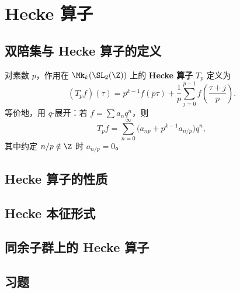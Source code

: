 \chapter{Hecke 算子}
\label{ch:hecke-operators}

\section{双陪集与 Hecke 算子的定义}

\begin{definition}[Hecke 算子]
对素数 $p$，作用在 $\Mk_k(\SL_2(\Z))$ 上的 \textbf{Hecke 算子} $T_p$ 定义为
\[
  (T_p f)(\tau) = p^{k-1} f(p\tau)
  + \frac{1}{p} \sum_{j=0}^{p-1} f\!\left(\frac{\tau + j}{p}\right).
\]
等价地，用 $q$-展开：若 $f = \sum a_n q^n$，则
\[
  T_p f = \sum_{n=0}^{\infty} \bigl( a_{np} + p^{k-1} a_{n/p} \bigr) q^n,
\]
其中约定 $n/p \notin \Z$ 时 $a_{n/p} = 0$。
\end{definition}

\section{Hecke 算子的性质}


\section{Hecke 本征形式}


\section{同余子群上的 Hecke 算子}


\section{习题}
